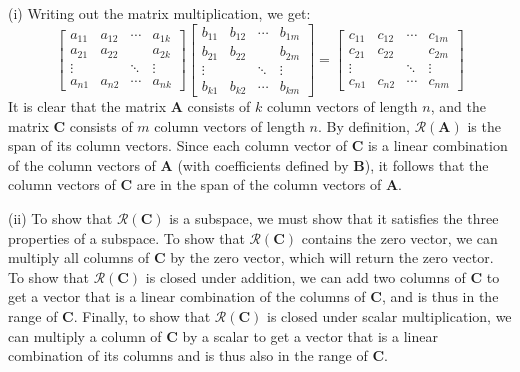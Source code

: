 \documentclass{homework}
\begin{document}
\begin{enumerate}[label=(\alph*)]
	      \par (i) Writing out the matrix multiplication, we get:
	      $$
		      \left[\begin{array}{cccc}
				      a_{11}  & a_{12} & \cdots & a_{1 k} \\
				      a_{21}  & a_{22} &        & a_{2 k} \\
				      \vdots  &        & \ddots & \vdots  \\
				      a_{n 1} & a_{n2} & \cdots & a_{n k}
			      \end{array}\right]
		      \left[\begin{array}{cccc}
				      b_{11}  & b_{12}  & \cdots & b_{1 m} \\
				      b_{21}  & b_{22}  &        & b_{2 m} \\
				      \vdots  &         & \ddots & \vdots  \\
				      b_{k 1} & b_{k 2} & \cdots & b_{k m}
			      \end{array}\right]=
		      \left[\begin{array}{cccc}
				      c_{11}  & c_{12}  & \cdots & c_{1 m} \\
				      c_{21}  & c_{22}  &        & c_{2 m} \\
				      \vdots  &         & \ddots & \vdots  \\
				      c_{n 1} & c_{n 2} & \cdots & c_{n m}
			      \end{array}\right]
	      $$
	      It is clear that the matrix $\mathbf{A}$ consists of $k$ column
	      vectors of length $n$, and the matrix $\mathbf{C}$ consists of $m$
	      column vectors of length $n$. By
	      definition, $\mathcal{R}(\mathbf{A})$ is the span of its column
	      vectors. Since each column vector of $\mathbf{C}$ is a linear
	      combination of the column vectors of $\mathbf{A}$ (with coefficients
	      defined by $\mathbf{B}$), it follows that
	      the column vectors of $\mathbf{C}$ are in the span of the column
	      vectors of $\mathbf{A}$.

	      \par (ii) To show that $\mathcal{R}(\mathbf{C})$ is a subspace, we must
	      show that it satisfies the three properties of a subspace. To show
	      that $\mathcal{R}(\mathbf{C})$ contains the zero vector, we can
	      multiply all columns of $\mathbf{C}$ by the zero vector, which will
	      return the zero vector. To show that $\mathcal{R}(\mathbf{C})$ is
	      closed under addition, we can add two columns of $\mathbf{C}$ to get
	      a vector that is a linear combination of the columns of $\mathbf{C}$,
	      and is thus in the range of $\mathbf{C}$.
	      Finally, to show that $\mathcal{R}(\mathbf{C})$ is closed under scalar
	      multiplication, we can multiply a column of $\mathbf{C}$ by a scalar
	      to get a vector that is a linear combination of its columns and is
	      thus also in the range of $\mathbf{C}$.


\end{enumerate}
\end{document}
